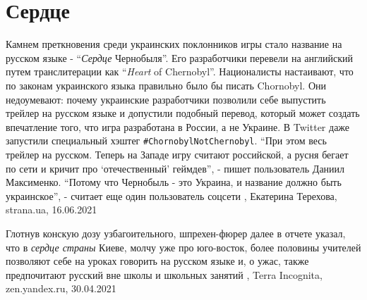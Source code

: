  
 
 
 
 
\chapter{Сердце}
\label{sec:slova.serdce}

Камнем преткновения среди украинских поклонников игры стало название на русском
языке - \enquote{\emph{Сердце} Чернобыля}. Его разработчики перевели на
английский путем транслитерации как \enquote{\emph{Heart} of Chernobyl}.
Националисты настаивают, что по законам украинского языка правильно было бы
писать Chornobyl. Они недоумевают: почему украинские разработчики позволили
себе выпустить трейлер на русском языке и допустили подобный перевод, который
может создать впечатление того, что игра разработана в России, а не Украине.  В
Twitter даже запустили специальный хэштег \verb|#ChornobylNotChernobyl|.
\enquote{При этом весь трейлер на русском. Теперь на Западе игру считают
российской, а русня бегает по сети и кричит про \enquote{отечественный}
геймдев}, - пишет пользователь Даниил Максименко.  \enquote{Потому что
Чернобыль - это Украина, и название должно быть украинское}, - считает еще один
пользователь соцсети
, 
Екатерина Терехова, strana.ua, 16.06.2021

Глотнув конскую дозу узбагоительного, шпрехен-фюрер далее в отчете указал, что
в \emph{сердце страны} Киеве, молчу уже про юго-восток, более половины учителей
позволяют себе на уроках говорить на русском языке и, о ужас, также
предпочитают русский вне школы и школьных занятий
, 
Terra Incognita, zen.yandex.ru, 30.04.2021
